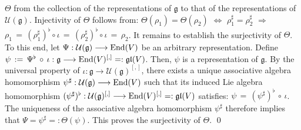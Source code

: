 \begin{enumerate}
	$\Theta$ from the collection of the representations of $\mathfrak{g}$
	to that of the representations of $\mathcal{U}(\mathfrak{g})$.
	Injectivity of $\Theta$ follows from:
	$\Theta(\rho_{1}) = \Theta(\rho_{2})$
	$\Longleftrightarrow$
	$\rho_{1}^{\sharp} = \rho_{2}^{\sharp}$
	$\Longrightarrow$
	$\rho_{1} \,=\, (\rho_{1}^{\sharp})^{\flat} \circ \iota \,=\, (\rho_{2}^{\sharp})^{\flat} \circ \iota \,=\, \rho_{2}$.
	It remains to establish the surjectivity of $\Theta$.
	To this end, let $\Psi : \mathcal{U}(\mathfrak{g}) \longrightarrow \textnormal{End}(V)$ be an arbitrary representation.
	Define $\psi \, := \, \Psi^{\flat} \,\circ\, \iota : \mathfrak{g} \longrightarrow \textnormal{End}(V)^{[,]} =: \mathfrak{gl}(V)$.
	Then, $\psi$ is a representation of $\mathfrak{g}$.
	By the universal property of
	$\iota : \mathfrak{g} \longrightarrow \mathcal{U}(\mathfrak{g})^{[,]}$,
	there exists a unique associative algebra homomorphism
	$\psi^{\sharp} : \mathcal{U}(\mathfrak{g}) \longrightarrow \textnormal{End}(V)$
	such that its induced Lie algebra homomorphism
	$(\psi^{\sharp})^{\flat} : \mathcal{U}(\mathfrak{g})^{[,]} \longrightarrow \textnormal{End}(V)^{[,]} =: \mathfrak{gl}(V)$
	satisfies:
	$\psi \,=\, (\psi^{\sharp})^{\flat} \,\circ\, \iota$.
	The uniqueness of the associative algebra homomorphism $\psi^{\sharp}$ therefore implies that
	$\Psi = \psi^{\sharp} =: \Theta(\psi)$.
	This proves the surjectivity of $\Theta$.
	\qed
\end{enumerate}



